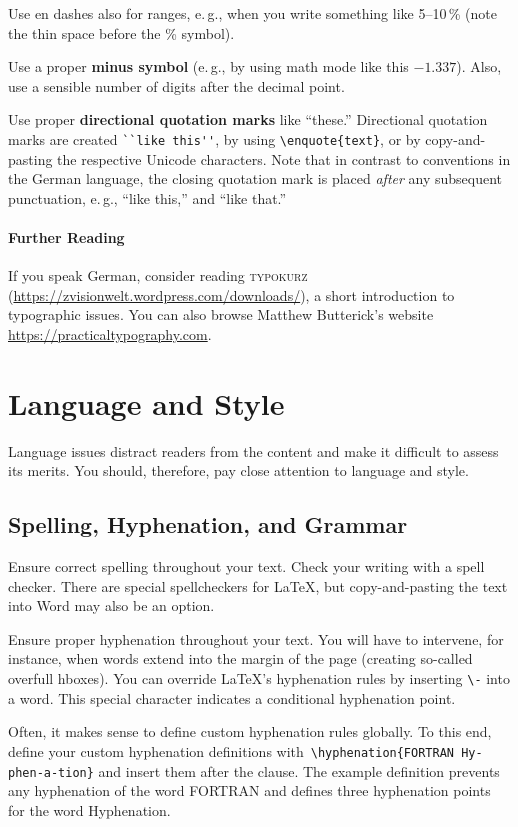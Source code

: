 Use en dashes also for ranges, e.\,g., when you write something like 5--10\,\% (note the thin space before the \% symbol).

Use a proper \textbf{minus symbol} (e.\,g., by using math mode like this \(-1.337\)). Also, use a sensible number of digits after the decimal point.

Use proper \textbf{directional quotation marks} like ``these.'' Directional quotation marks are created  \verb|``like this''|, by using \verb|\enquote{text}|, or by copy-and-pasting the respective Unicode characters. Note that in contrast to conventions in the German language, the closing quotation mark is placed \emph{after} any subsequent punctuation, e.\,g., ``like this,'' and ``like that.''

\paragraph{Further Reading}

If you speak German, consider reading \textsc{typokurz} (\url{https://zvisionwelt.wordpress.com/downloads/}), a short introduction to typographic issues. You can also browse Matthew Butterick's website \url{https://practicaltypography.com}.

\section{Language and Style}

Language issues distract readers from the content and make it difficult to assess its merits. You should, therefore, pay close attention to language and style.

\subsection{Spelling, Hyphenation, and Grammar}

Ensure correct spelling throughout your text. Check your writing with a spell checker. There are special spellcheckers for LaTeX, but copy-and-pasting the text into Word may also be an option.

Ensure proper hyphenation throughout your text. You will have to intervene, for instance, when words extend into the margin of the page (creating so-called overfull hboxes). You can override LaTeX's hyphenation rules by inserting \verb|\-| into a word. This special character indicates a conditional hyphenation point.

Often, it makes sense to define custom hyphenation rules globally. To this end, define your custom hyphenation definitions with\ \verb|\hyphenation{FORTRAN Hy-phen-a-tion}| and insert them after the \verb|| clause.
The example definition prevents any hyphenation of the word FORTRAN and defines three hyphenation points for the word Hyphenation.

